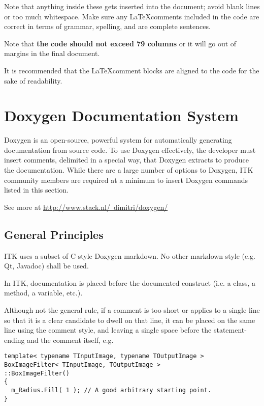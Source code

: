 Note that anything inside these gets inserted into the document; avoid blank
lines or too much whitespace. Make sure any \LaTeX comments included in the
code are correct in terms of grammar, spelling, and are complete sentences.

Note that \textbf{the code should not exceed 79 columns} or it will go out of
margins in the final document.

It is recommended that the \LaTeX comment blocks are aligned to the code for
the sake of readability.


\section{Doxygen Documentation System}
\label{sec:DoxygenDocumentationSystem}

Doxygen is an open-source, powerful system for automatically generating
documentation from source code. To use Doxygen effectively, the developer must
insert comments, delimited in a special way, that Doxygen extracts to produce
the documentation. While there are a large number of options to Doxygen,
ITK community members are required at a minimum to insert Doxygen commands
listed in this section.

See more at \href{http://www.stack.nl/~dimitri/doxygen/}
{http://www.stack.nl/~dimitri/doxygen/}


\subsection{General Principles}
\label{subsec:GeneralPrinciples}

ITK uses a subset of C-style Doxygen markdown. No other markdown style (e.g. Qt,
Javadoc) shall be used.

In ITK, documentation is placed before the documented construct (i.e. a class, a
method, a variable, etc.).

Although not the general rule, if a comment is too short or applies to a single
line so that it is a clear candidate to dwell on that line, it can be placed on
the same line using the \code{//} comment style, and leaving a single space
before the statement-ending \code{;} and the comment itself, e.g.

\small
\begin{verbatim}
template< typename TInputImage, typename TOutputImage >
BoxImageFilter< TInputImage, TOutputImage >
::BoxImageFilter()
{
  m_Radius.Fill( 1 ); // A good arbitrary starting point.
}
\end{verbatim}
\normalsize

